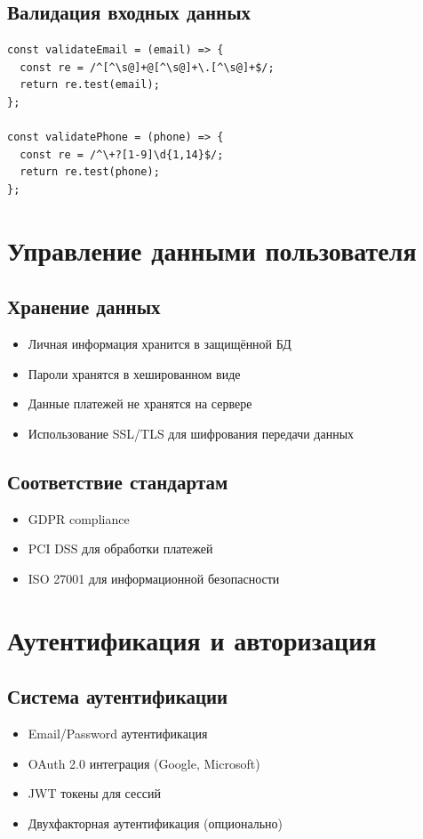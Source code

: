 \documentclass[12pt,a4paper]{report}
\begin{document}
\subsection{Валидация входных данных}
\begin{lstlisting}
const validateEmail = (email) => {
  const re = /^[^\s@]+@[^\s@]+\.[^\s@]+$/;
  return re.test(email);
};

const validatePhone = (phone) => {
  const re = /^\+?[1-9]\d{1,14}$/;
  return re.test(phone);
};
\end{lstlisting}

\section{Управление данными пользователя}

\subsection{Хранение данных}
\begin{itemize}
    \item Личная информация хранится в защищённой БД
    \item Пароли хранятся в хешированном виде
    \item Данные платежей не хранятся на сервере
    \item Использование SSL/TLS для шифрования передачи данных
\end{itemize}

\subsection{Соответствие стандартам}
\begin{itemize}
    \item GDPR compliance
    \item PCI DSS для обработки платежей
    \item ISO 27001 для информационной безопасности
\end{itemize}

\section{Аутентификация и авторизация}

\subsection{Система аутентификации}
\begin{itemize}
    \item Email/Password аутентификация
    \item OAuth 2.0 интеграция (Google, Microsoft)
    \item JWT токены для сессий
    \item Двухфакторная аутентификация (опционально)
\end{itemize}
\end{document}
